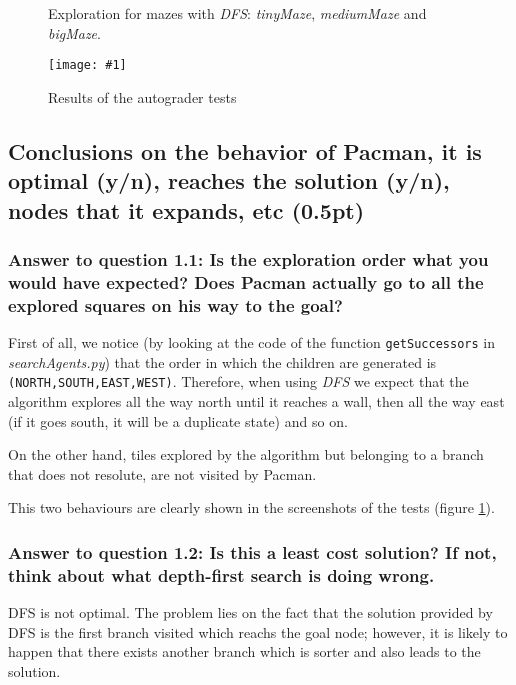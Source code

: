 \documentclass{article}
\newcommand{\myFigure}[4]{%
    \begin{figure}[H]
        \texttt{[image: \#1]}
        \centering
        \caption{#2}
        \label{#3}
    \end{figure}
}
\begin{document}
\begin{figure}[H]
    \centering
    \caption{Exploration for mazes with \emph{DFS}: \emph{tinyMaze}, \emph{mediumMaze} and \emph{bigMaze}.}
    \centering
    \label{exploration_e1}
\end{figure}

\myFigure{./img/ex1/test1}{Results of the autograder tests}{test1}{.7}

\subsection{Conclusions on the behavior of Pacman, it is optimal (y/n), reaches the solution (y/n), nodes that it expands, etc (0.5pt)}
\subsubsection{Answer to question 1.1: Is the exploration order what you would have expected? Does Pacman actually go to all the explored squares on his way to the goal?}
First of all, we notice (by looking at the code of the function \texttt{getSuccessors} in \textit{searchAgents.py}) that the order in which the children are generated is \texttt{(NORTH,SOUTH,EAST,WEST)}. Therefore, when using \textit{DFS} we expect that the algorithm explores all the way north until it reaches a wall, then all the way east (if it goes south, it will be a duplicate state) and so on. 

On the other hand, tiles explored by the algorithm but belonging to a branch that does not resolute, are not visited by Pacman.

This two behaviours are clearly shown in the screenshots of the tests (figure \ref{exploration_e1}).

\subsubsection{Answer to question 1.2: Is this a least cost solution? If not, think about what depth-first search is doing wrong.}

DFS is not optimal. The problem lies on the fact that the solution provided by DFS is the first branch visited which reachs the goal node; however, it is likely to happen that there exists another branch which is sorter and also leads to the solution.
\end{document}
